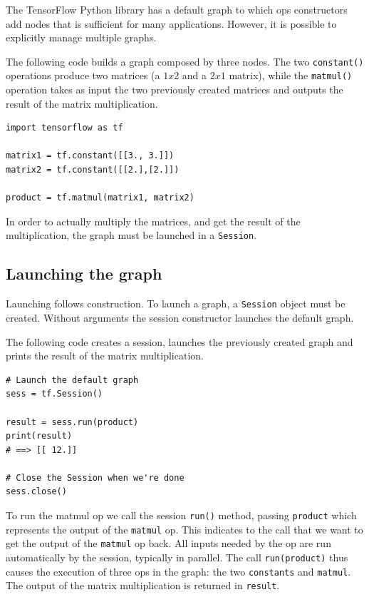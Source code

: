 The TensorFlow Python library has a default graph to which ops constructors add nodes that is sufficient for many applications. However, it is possible to explicitly manage multiple graphs.

The following code builds a graph composed by three nodes. The two \lstinline|constant()| operations produce two matrices (a $1x2$ and a $2x1$ matrix), while the \lstinline|matmul()| operation takes as input the two previously created matrices and outputs the result of the matrix multiplication.

\begin{lstlisting}
import tensorflow as tf

matrix1 = tf.constant([[3., 3.]])
matrix2 = tf.constant([[2.],[2.]])

product = tf.matmul(matrix1, matrix2)
\end{lstlisting}

In order to actually multiply the matrices, and get the result of the multiplication, the graph must be launched in a \lstinline|Session|.

\subsection{Launching the graph}

Launching follows construction. To launch a graph, a \lstinline|Session| object must be created. Without arguments the session constructor launches the default graph.

The following code creates a session, launches the previously created graph and prints the result of the matrix multiplication.

\begin{lstlisting}
# Launch the default graph
sess = tf.Session()

result = sess.run(product)
print(result)
# ==> [[ 12.]]

# Close the Session when we're done
sess.close()
\end{lstlisting}

To run the matmul op we call the session \lstinline|run()| method, passing \lstinline|product| which represents the output of the \lstinline|matmul| op. This indicates to the call that we want to get the output of the \lstinline|matmul| op back. All inputs needed by the op are run automatically by the session, typically in parallel. The call \lstinline|run(product)| thus causes the execution of three ops in the graph: the two \lstinline|constants| and \lstinline|matmul|. The output of the matrix multiplication is returned in \lstinline|result|.

